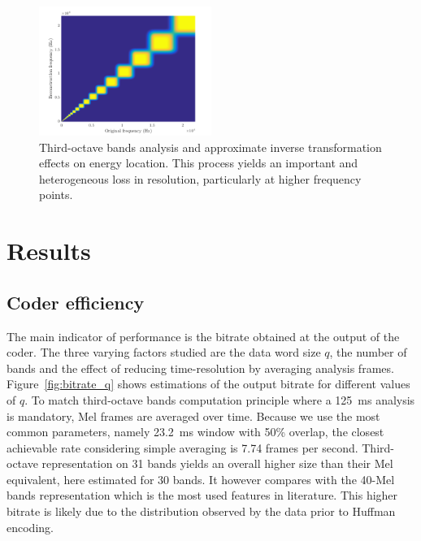 \documentclass[sensors,article,submit,moreauthors,pdftex,10pt,a4paper]{mdpi}
\begin{document}
\begin{figure}[htbp]
	\centering
		\includegraphics[width=0.5\textwidth]{figures/freq.png}
	\caption{Third-octave bands analysis and approximate inverse transformation effects on energy location. This process yields an important and heterogeneous loss in resolution, particularly at higher frequency points.}
	\label{fig:freq}
\end{figure}



\section{Results} \label{sec:results}

\subsection{Coder efficiency}

The main indicator of performance is the bitrate obtained at the output of the coder. The three varying factors studied are the data word size $q$, the number of bands and the effect of reducing time-resolution by averaging analysis frames. Figure~\ref{fig:bitrate_q} shows estimations of the output bitrate for different values of $q$. To match third-octave bands computation principle where a 125~ms analysis is mandatory, Mel frames are averaged over time. Because we use the most common parameters, namely 23.2~ms window with 50\% overlap, the closest achievable rate considering simple averaging is 7.74 frames per second. Third-octave representation on 31 bands yields an overall higher size than their Mel equivalent, here estimated for 30 bands. It however compares with the 40-Mel bands representation which is the most used features in literature. This higher bitrate is likely due to the distribution observed by the data prior to Huffman encoding.
\end{document}
